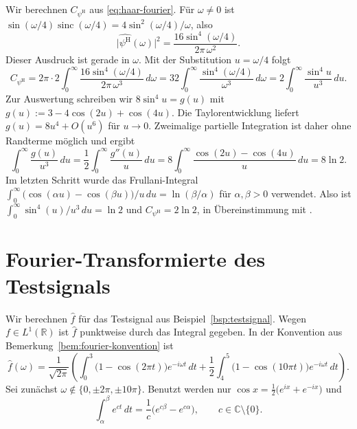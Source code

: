 \documentclass[a4paper,11pt,bibliography=totoc,listof=totoc,headinclude=true,cleardoublepage=empty,oneside]{scrbook}
\theoremstyle{plain}
\theoremstyle{definition}
\newcommand{\R}{\mathbb{R}}
\newcommand{\C}{\mathbb{C}}
\begin{document}
Wir berechnen $C_{\psi^{\mathrm H}}$ aus \eqref{eq:haar-fourier}. Für
$\omega \neq 0$ ist $\sin(\omega/4)\operatorname{sinc}(\omega/4) = 4\sin^2(\omega/4)/\omega$,
also
\[
  \bigl\lvert\widehat{\psi^{\mathrm{H}}}(\omega)\bigr\rvert^{2}
  = \frac{16\sin^{4}(\omega/4)}{2\pi\,\omega^{2}} .
\]
Dieser Ausdruck ist gerade in $\omega$. Mit der Substitution $u = \omega/4$
folgt
\[
  C_{\psi^{\mathrm H}}
  = 2\pi \cdot 2 \int_0^\infty \frac{16\sin^{4}(\omega/4)}{2\pi\,\omega^{3}}\,d\omega
  = 32\int_0^\infty \frac{\sin^{4}(\omega/4)}{\omega^{3}}\,d\omega
  = 2\int_0^\infty \frac{\sin^{4}u}{u^{3}}\,du .
\]
Zur Auswertung schreiben wir $8\sin^4 u = g(u)$ mit
$g(u) := 3 - 4\cos(2u) + \cos(4u)$. Die Taylorentwicklung liefert
$g(u) = 8u^4 + O(u^6)$ für $u \to 0$. Zweimalige partielle Integration ist
daher ohne Randterme möglich und ergibt
\[
  \int_0^\infty \frac{g(u)}{u^{3}}\,du
  = \frac12\int_0^\infty \frac{g''(u)}{u}\,du
  = 8\int_0^\infty \frac{\cos(2u) - \cos(4u)}{u}\,du
  = 8\ln 2 .
\]
Im letzten Schritt wurde das Frullani-Integral
$\int_0^\infty \bigl(\cos(\alpha u) - \cos(\beta u)\bigr)/u\,du = \ln(\beta/\alpha)$
für $\alpha,\beta > 0$ verwendet. Also ist
$\int_0^\infty \sin^4(u)/u^3\,du = \ln 2$ und
$C_{\psi^{\mathrm H}} = 2\ln 2$, in Übereinstimmung mit
\cite[Kap.~1.1, Beispiel~(1)]{lmr}. %
 
\section{Fourier-Transformierte des Testsignals}
\label{anh:fourier-testsignal}
 
Wir berechnen $\hat f$ für das Testsignal aus Beispiel~\ref{bsp:testsignal}.
Wegen $f\in L^1(\R)$ ist $\hat f$ punktweise durch das Integral gegeben. In
der Konvention aus Bemerkung~\ref{bem:fourier-konvention} ist
\[
  \hat f(\omega)
  =\frac{1}{\sqrt{2\pi}}\left(
      \int_0^3\bigl(1-\cos(2\pi t)\bigr)e^{-i\omega t}\,dt
      +\frac12\int_4^5\bigl(1-\cos(10\pi t)\bigr)e^{-i\omega t}\,dt
    \right).
\]
Sei zunächst $\omega\notin\{0,\pm2\pi,\pm10\pi\}$. Benutzt werden nur
$\cos x=\tfrac12\bigl(e^{ix}+e^{-ix}\bigr)$ und
\begin{equation}\label{eq:stammfunktion-exp}
  \int_\alpha^\beta e^{ct}\,dt=\frac{1}{c}\bigl(e^{c\beta}-e^{c\alpha}\bigr),
  \qquad c\in\C\setminus\{0\}.
\end{equation}
 
\end{document}
